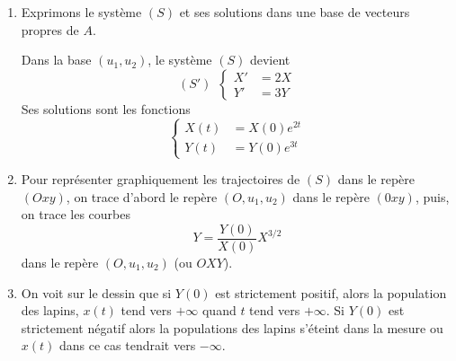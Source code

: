 {{\begin {enumerate}
$$\begin{pmatrix}2x \\  2y\end{pmatrix}\iff x=y,$$
d'o\`u le vecteur propre $u_1=(1,1)$ associ\'e \`a la valeur propre $\lambda_1=2$ . 
$$\begin{pmatrix}4&-2 \\ 1&1 \\ \end{pmatrix}\begin{pmatrix}x \\  y\end{pmatrix}=
\begin{pmatrix}3x \\  3y\end{pmatrix}\iff x=2y,$$
d'o\`u le vecteur propre $u_2=(2,1)$ associ\'e \`a la valeur propre $\lambda_2=3$ .
Dans la base $(u_1, u_2)$, la matrice s'\'ecrit
$$A'=\begin{pmatrix}2&0 \\ 0&3 \\ \end{pmatrix}.$$
On a $A=PA'P^{-1}$ o\`u
$$P=\begin{pmatrix}1&2 \\ 1&1 \\  \end{pmatrix}\ {\hbox{et}}\ P^{-1}=\begin{pmatrix}-1&2 \\ 1&-1 \\ \end{pmatrix}.$$
  \item Exprimons le syst\`eme $(S)$ et ses solutions dans une base de vecteurs propres de $A$.

Dans la base $(u_1, u_2)$, le syst\`eme $(S)$ devient
$$(S')\ \ \left\{\begin{align*}X'&= 2X \\  Y'&= 3Y\end{align*}\right.$$
Ses solutions sont les fonctions
$$\left\{\begin{align*}X(t)&= X(0)e^{2t} \\  Y(t)&=Y(0)e^{3t}\end{align*}\right.$$

  \item  Pour repr\'esenter graphiquement les trajectoires de $(S)$ dans le rep\`ere $(Oxy)$, on trace d'abord le rep\`ere $(O, u_1,u_2)$ dans le rep\`ere $(0xy)$, puis, on trace les courbes $$Y={\frac{Y(0)}{X(0)}}X^{3/2}$$
dans le rep\`ere $(O, u_1,u_2)$ (ou $OXY$).

  \item On voit sur le dessin que si $Y(0)$ est strictement positif, alors la population des lapins, $x(t)$ tend vers $+\infty$ quand $t$ tend vers $+\infty$. Si $Y(0)$ est strictement n\'egatif alors la populations des lapins s'\'eteint dans la mesure ou $x(t)$ dans ce cas tendrait vers $-\infty$.
\end {enumerate}
}
}
